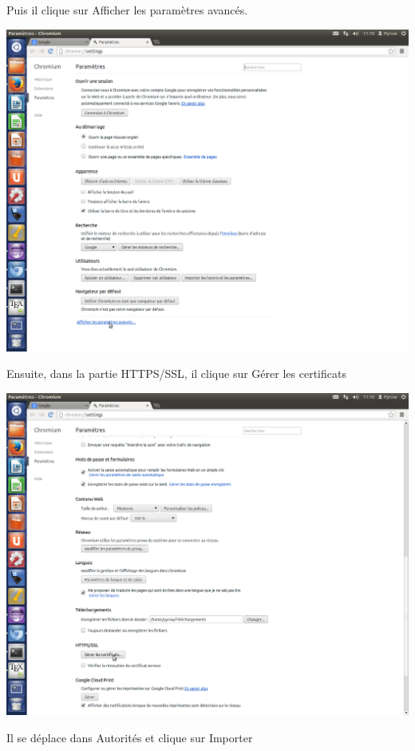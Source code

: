 Puis il clique sur Afficher les paramètres avancés.

\includegraphics[width=\textwidth]{images_autorites/ChromeAvance.png} 
\newpage

Ensuite, dans la partie HTTPS/SSL, il clique sur Gérer les certificats

\includegraphics[width=\textwidth]{images_autorites/ChromeCert.png} 
\newpage

Il se déplace dans Autorités et clique sur Importer


